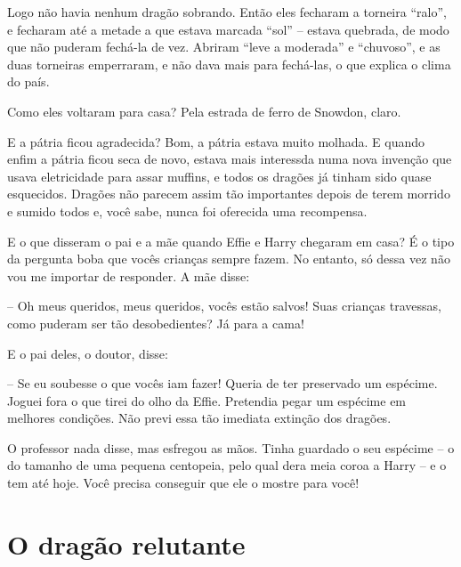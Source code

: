 Logo não havia nenhum dragão sobrando. Então eles fecharam a torneira
“ralo”, e fecharam até a metade a que estava marcada “sol” -- estava
quebrada, de modo que não puderam fechá-la de vez. Abriram “leve a
moderada” e “chuvoso”, e as duas torneiras emperraram, e não dava
mais para fechá-las, o que explica o clima do país.


\bigskip

Como eles voltaram para casa? Pela estrada de ferro de Snowdon, claro.

E a pátria ficou agradecida? Bom, a pátria estava muito molhada. E
quando enfim a pátria ficou seca de novo, estava mais interessda numa
nova invenção que usava eletricidade para assar muffins, e todos os
dragões já tinham sido quase esquecidos. Dragões não parecem assim
tão importantes depois de terem morrido e sumido todos e, você sabe,
nunca foi oferecida uma recompensa.

E o que disseram o pai e a mãe quando Effie e Harry chegaram em casa?
É o tipo da pergunta boba que vocês crianças sempre fazem. No
entanto, só dessa vez não vou me importar de responder. A mãe disse:

-- Oh meus queridos, meus queridos, vocês estão salvos! Suas crianças
travessas, como puderam ser tão desobedientes? Já para a cama!

E o pai deles, o doutor, disse:

-- Se eu soubesse o que vocês iam fazer! Queria de ter preservado um
espécime. Joguei fora o que tirei do olho da Effie. Pretendia pegar
um espécime em melhores condições. Não previ essa tão imediata
extinção dos dragões.

O professor nada disse, mas esfregou as mãos. Tinha guardado o seu
espécime -- o do tamanho de uma pequena centopeia, pelo qual dera meia
coroa a Harry -- e o tem até hoje. Você precisa conseguir que ele o
mostre para você!

\chapter{O dragão relutante}

